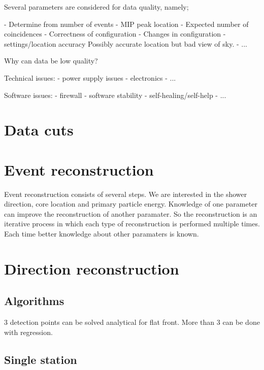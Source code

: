 Several parameters are considered for data quality, namely;

- Determine from number of events
- MIP peak location
- Expected number of coincidences
- Correctness of configuration
- Changes in configuration
- \gps settings/location accuracy
    Possibly accurate location but bad view of sky.
- ...


Why can data be low quality?

Technical issues:
- power supply issues
- electronics
- ...

Software issues:
- firewall
- software stability
- self-healing/self-help
- ...


\section{Data cuts}




\section{Event reconstruction}

Event reconstruction consists of several steps. We are interested in the
shower direction, core location and primary particle energy. Knowledge
of one  parameter can improve the reconstruction of another paramater.
So the reconstruction is an iterative process in which each type of
reconstruction is performed multiple times. Each time better knowledge
about other paramaters is known.


\section{Direction reconstruction}

\subsection{Algorithms}

3 detection points can be solved analytical for flat front.
More than 3 can be done with regression.

\subsection{Single station}

